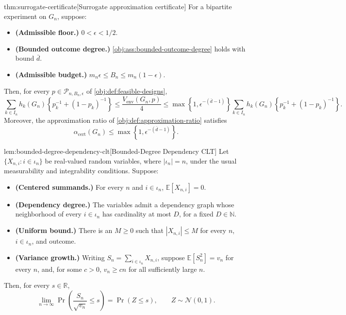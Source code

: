 \begin{theoremv}{thm:surrogate-certificate}[Surrogate approximation certificate]
For a bipartite experiment on \(G_n\), suppose:
\begin{itemize}
\item \textbf{(Admissible floor.)} \(0<\epsilon<1/2\).
\item \textbf{(Bounded outcome degree.)} \cref{obj:ass:bounded-outcome-degree} holds with bound \(\bar d\).
\item \textbf{(Admissible budget.)} \(m_n\epsilon\le B_n\le m_n(1-\epsilon)\).
\end{itemize}
Then, for every \(p\in\mathcal P_{n,B_n,\epsilon}\) of \cref{obj:def:feasible-designs},
\[
\sum_{k\in I_n}h_k(G_n)\!\left\{p_k^{-1}+(1-p_k)^{-1}\right\}
\le \frac{V_{\mathrm{env}}(G_n,p)}{4}
\le
\max\!\left\{1,\epsilon^{-(\bar d-1)}\right\}
\sum_{k\in I_n}h_k(G_n)\!\left\{p_k^{-1}+(1-p_k)^{-1}\right\}.
\]
Moreover, the approximation ratio of \cref{obj:def:approximation-ratio} satisfies
\[
\alpha_{\mathrm{cert}}(G_n)\le
\max\!\left\{1,\epsilon^{-(\bar d-1)}\right\}.
\]
\end{theoremv}

\begin{lemmav}{lem:bounded-degree-dependency-clt}[Bounded-Degree Dependency CLT]
Let \(\{X_{n,i}: i\in\iota_n\}\) be real-valued random variables, where \(|\iota_n|=n\), under the usual measurability and integrability conditions. Suppose:
\begin{itemize}
\item \textbf{(Centered summands.)} For every \(n\) and \(i\in\iota_n\), \(\mathbb E[X_{n,i}]=0\).
\item \textbf{(Dependency degree.)} The variables admit a dependency graph whose neighborhood of every \(i\in\iota_n\) has cardinality at most \(D\), for a fixed \(D\in\mathbb N\).
\item \textbf{(Uniform bound.)} There is an \(M\ge 0\) such that \(|X_{n,i}|\le M\) for every \(n\), \(i\in\iota_n\), and outcome.
\item \textbf{(Variance growth.)} Writing \(S_n=\sum_{i\in\iota_n}X_{n,i}\), suppose \(\mathbb E[S_n^2]=v_n\) for every \(n\), and, for some \(c>0\), \(v_n\ge cn\) for all sufficiently large \(n\).
\end{itemize}
Then, for every \(s\in\mathbb R\),
\[
\lim_{n\to\infty}\Pr\!\left(\frac{S_n}{\sqrt{v_n}}\le s\right)
=
\Pr\!\left(Z\le s\right),
\qquad Z\sim\mathcal N(0,1).
\]
\end{lemmav}
